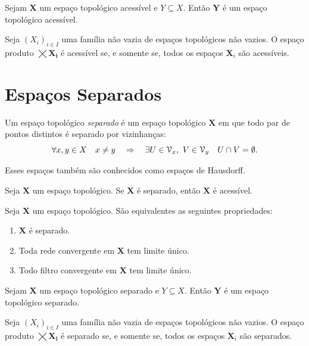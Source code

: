 \begin{prop}
	Sejam $\bm X$ um espaço topológico acessível e  $Y \subseteq X$. Então $\bm Y$ é um espaço topológico acessível.
\end{prop}

\begin{prop}
	Seja $(X_i)_{i \in I}$ uma família não vazia de espaços topológicos não vazios. O espaço produto $\bm{\bigtimes X_i}$ é acessível se, e somente se, todos os espaços $\bm X_i$ são acessíveis.
\end{prop}

\section{Espaços Separados}

\begin{defi}[$T_2$]
	Um espaço topológico \emph{separado} é um espaço topológico $\bm X$ em que todo par de pontos distintos é separado por vizinhanças:
	\begin{equation*}
	\forall x,y \in X \quad x \neq y \quad \Rightarrow \quad \exists U \in \mathcal{V}_x,\ V \in \mathcal{V}_y \quad U \cap V = \emptyset.
	\end{equation*}
\end{defi}
Esses espaços também são conhecidos como espaços de Hausdorff.

\begin{prop}[$T_2 \Rightarrow T_1$]
	Seja $\bm X$ um espaço topológico. Se $\bm X$ é separado, então $\bm X$ é acessível.
\end{prop}

\begin{prop}
	Seja $\bm X$ um espaço topológico. São equivalentes as seguintes propriedades:
	\begin{enumerate}
	\item $\bm X$ é separado.
	\item Toda rede convergente em $\bm X$ tem limite único.
	\item Todo filtro convergente em $\bm X$ tem limite único.
	\end{enumerate}
\end{prop}

\begin{prop}
	Sejam $\bm X$ um espaço topológico separado e $Y \subseteq X$. Então $\bm Y$ é um espaço topológico separado.
\end{prop}

\begin{prop}
	Seja $(X_i)_{i \in I}$ uma família não vazia de espaços topológicos não vazios. O espaço produto $\bm{\bigtimes X_i}$ é separado se, e somente se, todos os espaços $\bm X_i$ são separados.
\end{prop}


